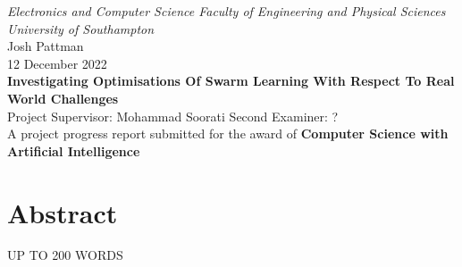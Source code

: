 \documentclass[12pt,a4paper,titlepage]{report}
\begin{document}
	\begin{titlepage}
		\centering\Large\emph{Electronics and Computer Science Faculty of Engineering and Physical Sciences University of Southampton}
		\\[3cm]
		\centering\Large{Josh Pattman} \\
		\centering\Large{12 December 2022} \\
		\centering\huge\textbf{Investigating Optimisations Of Swarm Learning With Respect To Real World Challenges}
		\\[4cm]
		\centering\Large{Project Supervisor: Mohammad Soorati}
		\centering\Large{Second Examiner: ?}
		\\[3cm]
		\centering\Large{A project progress report submitted for the award of \textbf{Computer Science with Artificial Intelligence}}
	\end{titlepage}


	\chapter*{Abstract}
	UP TO 200 WORDS

	\tableofcontents
	
	
	
	
	
	
	{}
\end{document}
